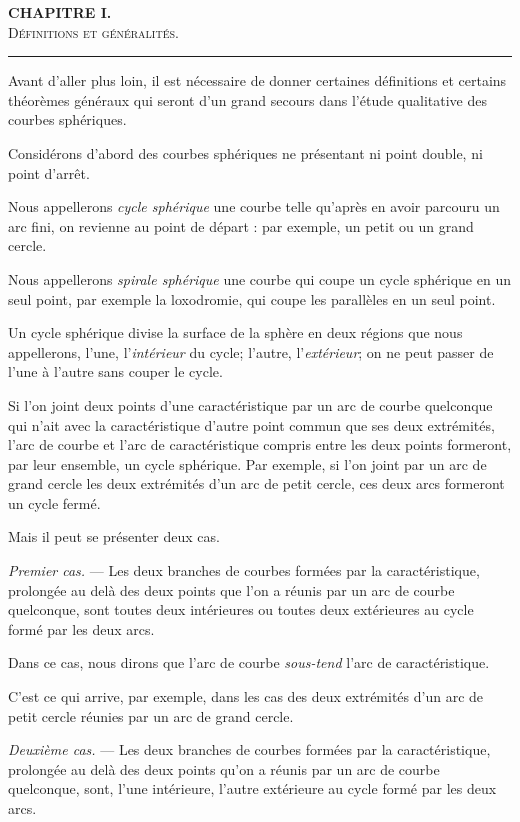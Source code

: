 \documentclass[11pt]{article}
\newcommand{\shortline}{\begin{center}\rule{3.5em}{0.4pt}\end{center}}
\begin{document}
\begin{center}
{\bfseries CHAPITRE I.}\\[0.8em]
{\scshape Définitions et généralités.}
\end{center}

\shortline

Avant d’aller plus loin, il est nécessaire de donner certaines définitions et certains théorèmes généraux qui seront d’un grand secours dans l’étude qualitative des courbes sphériques.

Considérons d’abord des courbes sphériques ne présentant ni point double, ni point d’arrêt.

Nous appellerons \emph{cycle sphérique} une courbe telle qu’après en avoir parcouru un arc fini, on revienne au point de départ : par exemple, un petit ou un grand cercle.

Nous appellerons \emph{spirale sphérique} une courbe qui coupe un cycle sphérique en un seul point, par exemple la loxodromie, qui coupe les parallèles en un seul point.

Un cycle sphérique divise la surface de la sphère en deux régions que nous appellerons, l’une, l’\emph{intérieur} du cycle; l’autre, l’\emph{extérieur}; on ne peut passer de l’une à l’autre sans couper le cycle.

Si l’on joint deux points d’une caractéristique par un arc de courbe quelconque qui n’ait avec la caractéristique d’autre point commun que ses deux extrémités, l’arc de courbe et l’arc de caractéristique compris entre les deux points formeront, par leur ensemble, un cycle sphérique. Par exemple, si l’on joint par un arc de grand cercle les deux extrémités d’un arc de petit cercle, ces deux arcs formeront un cycle fermé.

Mais il peut se présenter deux cas.

\emph{Premier cas.} --- Les deux branches de courbes formées par la caractéristique, prolongée au delà des deux points que l’on a réunis par un arc de courbe quelconque, sont toutes deux intérieures ou toutes deux extérieures au cycle formé par les deux arcs.

Dans ce cas, nous dirons que l’arc de courbe \emph{sous-tend} l’arc de caractéristique.

C’est ce qui arrive, par exemple, dans les cas des deux extrémités d’un arc de petit cercle réunies par un arc de grand cercle.

\emph{Deuxième cas.} --- Les deux branches de courbes formées par la caractéristique, prolongée au delà des deux points qu’on a réunis par un arc de courbe quelconque, sont, l’une intérieure, l’autre extérieure au cycle formé par les deux arcs.
\end{document}
